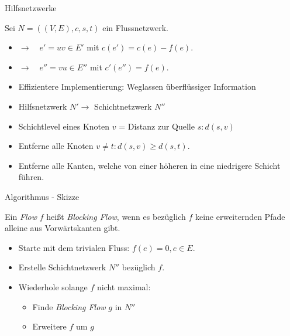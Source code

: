\documentclass[aspectratio=169]{beamer}
\begin{document}
\begin{frame}{Hilfsnetzwerke}

  Sei $N = ((V,E), c, s, t)$ ein Flussnetzwerk.

  \begin{definition}[Hilfsnetzwerk $N' = ((V,E'), c', s, t)$]  
  
    \begin{itemize}
      \item{ $\rightarrow \quad e' = uv \in E'$ mit $c(e') = c(e) - f(e)$.}
      \item{ $\rightarrow \quad e'' = vu \in E''$ mit $c'(e'') = f(e)$.}
    \end{itemize}
  \end{definition}

  \begin{itemize}
    \item Effizientere Implementierung: Weglassen überflüssiger Information
    \item Hilfsnetzwerk $N' \rightarrow$ Schichtnetzwerk $N''$
    \item Schichtlevel eines Knoten $v$ = Distanz zur Quelle $s: d(s,v)$
    \item Entferne alle Knoten $v \neq t: d(s,v) \geq d(s,t)$.
    \item Entferne alle Kanten, welche von einer höheren in eine niedrigere Schicht führen.
  \end{itemize}

\end{frame}


\begin{frame}{Algorithmus - Skizze}

  \begin{definition}
    Ein \textit{Flow} $f$ heißt \textit{Blocking Flow}, wenn
    es bezüglich $f$ keine erweiternden Pfade alleine aus
    Vorwärtskanten gibt.
  \end{definition}
  
  \begin{algorithmus*}
    \begin{itemize}
      \item Starte mit dem trivialen Fluss: $f(e) = 0 , e \in E$.
      \item Erstelle Schichtnetzwerk $N''$ bezüglich $f$.
      \item Wiederhole solange $f$ nicht maximal:
      \begin{itemize}
        \item Finde \textit{Blocking Flow} $g$ in $N''$
        \item Erweitere $f$ um $g$
      \end{itemize}
    \end{itemize}
  \end{algorithmus*}

\end{frame}
\end{document}
